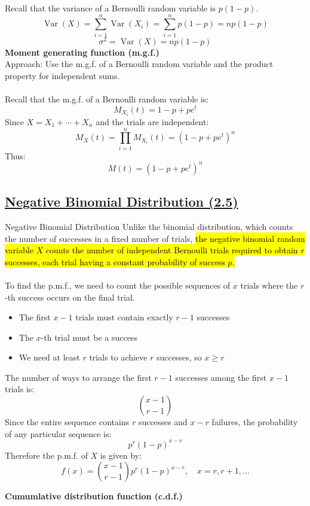 ﻿\documentclass[12pt]{article}
\begin{document}
Recall that the variance of a Bernoulli random variable is $p(1-p)$.
\[
\operatorname{Var}(X)=\sum_{i=1}^{n}\operatorname{Var}(X_i)=\sum_{i=1}^{n}p(1-p)=np(1-p)
\]
\[
\boxed{\sigma^2=\operatorname{Var}(X)=np(1-p)}
\]
\textbf{Moment generating function (m.g.f.)}\\
Approach: Use the m.g.f. of a Bernoulli random variable and the product property for independent sums.\\\\
Recall that the m.g.f. of a Bernoulli random variable is:
\[
M_{X_i}(t)=1-p+pe^t
\]
Since \(X=X_1+\cdots+X_n\) and the trials are independent:
\[
M_X(t)=\prod_{i=1}^{n}M_{X_i}(t)=(1-p+pe^t)^n
\]
Thus:
\[
\boxed{M(t)=(1-p+pe^t)^n}
\]
\subsection*{\underline{Negative Binomial Distribution (2.5)}}
\begin{definition}{Negative Binomial Distribution}
    Unlike the binomial distribution, which counts the number of successes in a fixed number of trials, \hl{the negative binomial random variable \mbox{$X$} counts the number of independent Bernoulli trials required to obtain \mbox{$r$} successes, each trial having a constant probability of success \mbox{$p$}.}\\\\
    To find the p.m.f., we need to count the possible sequences of \(x\) trials where the \(r\)-th success occurs on the final trial.
    \begin{itemize}
        \item The first $x-1$ trials must contain exactly $r-1$ successes
        \item The $x$-th trial must be a success
        \item We need at least $r$ trials to achieve $r$ successes, so $x \geq r$
    \end{itemize}
    The number of ways to arrange the first \(r-1\) successes among the first \(x-1\) trials is:
\[
\binom{x-1}{r-1}
\]
Since the entire sequence contains \(r\) successes and \(x-r\) failures, the probability of any particular sequence is:
\[
p^r(1-p)^{x-r}
\]
Therefore the p.m.f. of $X$ is given by:
    \[\boxed{f(x)=\binom{x-1}{r-1}p^r(1-p)^{x-r},\quad x=r,r+1,\ldots}\]
\end{definition}
\textbf{Cumumlative distribution function (c.d.f.)}\\
\end{document}
